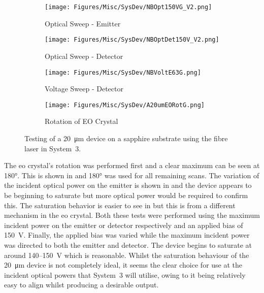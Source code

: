 \begin{figure}[ht]
\centering

\begin{subfigure}{0.49\textwidth}
\centering
\texttt{[image: Figures/Misc/SysDev/NBOpt150VG\_V2.png]}
\caption{Optical Sweep - Emitter}
\label{fig:NBOpt150V}
\end{subfigure}
\begin{subfigure}{0.49\textwidth}
\centering
\texttt{[image: Figures/Misc/SysDev/NBOptDet150V\_V2.png]}
\caption{Optical Sweep - Detector}
\label{fig:NBOptDet150V}
\end{subfigure}

\begin{subfigure}{0.49\textwidth}
\centering
\texttt{[image: Figures/Misc/SysDev/NBVoltE63G.png]}
\caption{Voltage Sweep - Detector}
\label{fig:NBVoltE63G}
\end{subfigure}
\begin{subfigure}{0.49\textwidth}
\centering
\texttt{[image: Figures/Misc/SysDev/A20umEORotG.png]}
\caption{Rotation of EO Crystal}
\label{fig:A20umEORotG}
\end{subfigure}

\captionsetup{font = footnotesize, justification = centering}
\caption[Testing of a \SI{20}{\micro\metre} Device on a Sapphire Substrate using the Fibre Laser]{Testing of a \SI{20}{\micro\metre} device on a sapphire substrate using the fibre laser in System~3.}
\label{Fig:fiblaser}
\end{figure}

The \acrshort{eo} crystal's rotation was performed first and a clear maximum can be seen at \ang{180}. This is shown in  and \ang{180} was used for all remaining scans. The variation of the incident optical power on the emitter is shown in  and the device appears to be beginning to saturate but more optical power would be required to confirm this. The saturation behavior is easier to see in  but this is from a different mechanism in the \acrshort{eo} crystal. Both these tests were performed using the maximum incident power on the emitter or detector respectively and an applied bias of \SI{150}{V}. Finally, the applied bias was varied while the maximum incident power was directed to both the emitter and detector. The device begins to saturate at around 140--\SI{150}{V} which is reasonable. Whilst the saturation behaviour of the \SI{20}{\micro\metre} device is not completely ideal, it seems the clear choice for use at the incident optical powers that System~3 will utilise, owing to it being relatively easy to align whilst producing a desirable output. 


